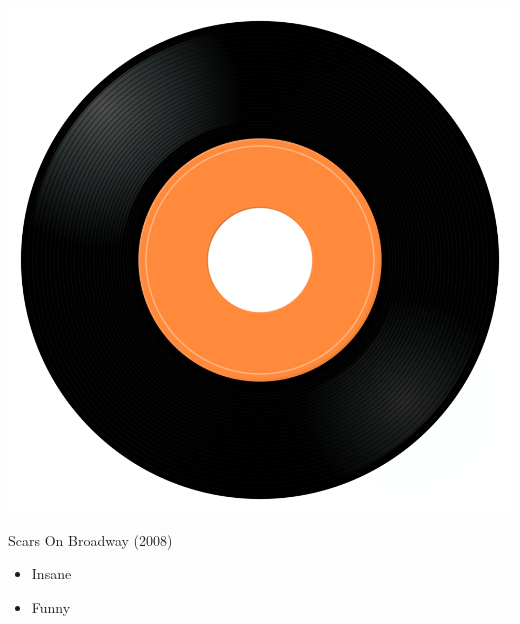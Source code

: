 \begin{minipage}[t]{0.25\textwidth}
\captionsetup{type=figure}
\includegraphics[width=\textwidth]{Images/cover.png}
\caption*{Scars On Broadway (2008)}
\end{minipage}
\begin{minipage}[t]{0.25\textwidth}\vspace{0pt}
\begin{itemize}[nosep,leftmargin=1em,labelwidth=*,align=left]
	\setlength{\itemsep}{0pt}
	\item Insane
	\item Funny
\end{itemize}
\end{minipage}
